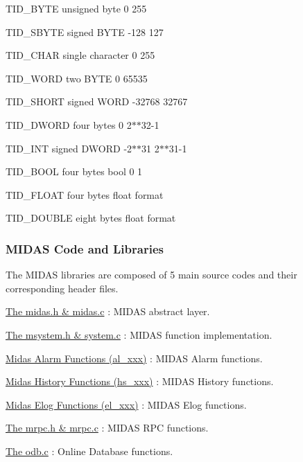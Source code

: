 \begin{DoxyItemize}
\item TID\_\-BYTE unsigned byte 0 255
\item TID\_\-SBYTE signed BYTE -\/128 127
\item TID\_\-CHAR single character 0 255
\item TID\_\-WORD two BYTE 0 65535
\item TID\_\-SHORT signed WORD -\/32768 32767
\item TID\_\-DWORD four bytes 0 2$\ast$$\ast$32-\/1
\item TID\_\-INT signed DWORD -\/2$\ast$$\ast$31 2$\ast$$\ast$31-\/1
\item TID\_\-BOOL four bytes bool 0 1
\item TID\_\-FLOAT four bytes float format
\item TID\_\-DOUBLE eight bytes float format
\end{DoxyItemize}







 \hypertarget{F_Midas_Code_and_Libraries_F_Midas_Library}{}\subsubsection{MIDAS Code and Libraries}\label{F_Midas_Code_and_Libraries_F_Midas_Library}
The MIDAS libraries are composed of 5 main source codes and their corresponding header files.


\begin{DoxyEnumerate}
\item \hyperlink{group__midasincludecode}{The midas.h \& midas.c} : MIDAS abstract layer.
\item \hyperlink{group__msystemincludecode}{The msystem.h \& system.c} : MIDAS function implementation.
\item \hyperlink{group__alfunctioncode}{Midas Alarm Functions (al\_\-xxx)} : MIDAS Alarm functions.
\item \hyperlink{group__hsfunctioncode}{Midas History Functions (hs\_\-xxx)} : MIDAS History functions.
\item \hyperlink{group__elfunctioncode}{Midas Elog Functions (el\_\-xxx)} : MIDAS Elog functions.
\item \hyperlink{group__mrpcincludecode}{The mrpc.h \& mrpc.c} : MIDAS RPC functions.
\item \hyperlink{group__odbcode}{The odb.c} : Online Database functions.
\end{DoxyEnumerate}

